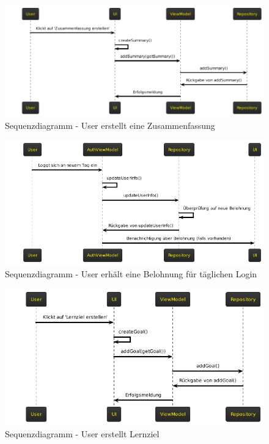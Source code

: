 \begin{figure}[H]
    \centering
    \includegraphics[width=1\textwidth]{images/diagramme/sequenzdiagramme/user_erstellt_zusammenfassung.png}
    \caption{Sequenzdiagramm - User erstellt eine Zusammenfassung}
    \label{fig:sequenz_user_erstellt_zusammenfassung}
\end{figure} 
\begin{figure}[H]
    \centering
    \includegraphics[width=1\textwidth]{images/diagramme/sequenzdiagramme/user_login_belohnung.png}
    \caption{Sequenzdiagramm - User erhält eine Belohnung für täglichen Login}
    \label{fig:sequenz_user_login_belohnung}
\end{figure} 
\begin{figure}[H]
    \centering
    \includegraphics[width=1\textwidth]{images/diagramme/sequenzdiagramme/user_erstellt_lernziel.png}
    \caption{Sequenzdiagramm - User erstellt Lernziel}
    \label{fig:sequenz_user_erstellt_lernziel}
\end{figure} 
